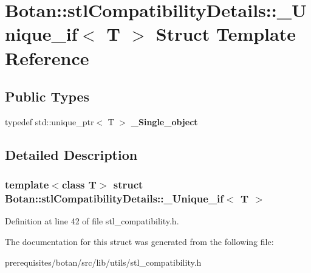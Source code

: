 \hypertarget{struct_botan_1_1stl_compatibility_details_1_1___unique__if}{}\section{Botan\+:\+:stl\+Compatibility\+Details\+:\+:\+\_\+\+Unique\+\_\+if$<$ T $>$ Struct Template Reference}
\label{struct_botan_1_1stl_compatibility_details_1_1___unique__if}
\subsection*{Public Types}
\begin{DoxyCompactItemize}
\item 
\mbox{\label{struct_botan_1_1stl_compatibility_details_1_1___unique__if_a120403bf785feec27820c1f50e6e7b21}} 
typedef std\+::unique\+\_\+ptr$<$ T $>$ {\bfseries \+\_\+\+Single\+\_\+object}
\end{DoxyCompactItemize}


\subsection{Detailed Description}
\subsubsection*{template$<$class T$>$\newline
struct Botan\+::stl\+Compatibility\+Details\+::\+\_\+\+Unique\+\_\+if$<$ T $>$}



Definition at line 42 of file stl\+\_\+compatibility.\+h.



The documentation for this struct was generated from the following file\+:\begin{DoxyCompactItemize}
\item 
prerequisites/botan/src/lib/utils/stl\+\_\+compatibility.\+h\end{DoxyCompactItemize}
